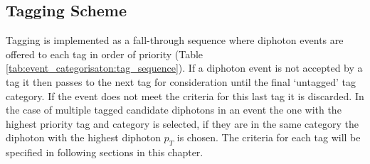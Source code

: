 \subsection{Tagging Scheme}
Tagging is implemented as a fall-through sequence where diphoton events are offered to each tag in order of priority (Table \ref{tab:event_categorisaton:tag_sequence}). 
If a diphoton event is not accepted by a tag it then passes to the next tag for consideration until the final `untagged' tag category. 
If the event does not meet the criteria for this last tag it is discarded.
In the case of multiple tagged candidate diphotons in an event the one with the highest priority tag and category is selected, if they are in the same category the diphoton with the highest diphoton $p_{T}$ is chosen.
The criteria for each tag will be specified in following sections in this chapter.
\begin{table}[h!]
    \centering
    \caption{The \Hgg tag sequence in order of tag priority from highest (top) to lowest (bottom).}
    \label{tab:event_categorisaton:tag_sequence}
\end{table}







